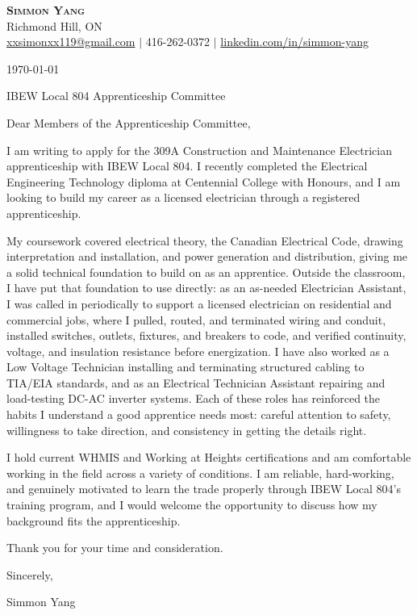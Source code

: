 \documentclass[letterpaper,11pt]{article}
\begin{document}
\begin{center}
    \textbf{\Huge \scshape Simmon Yang} \\ \vspace{1pt}
    Richmond Hill, ON \\
    \href{mailto:xxsimonxx119@gmail.com}{xxsimonxx119@gmail.com} $|$ 416-262-0372 $|$
    \href{https://www.linkedin.com/in/simmon-yang/}{linkedin.com/in/simmon-yang}
\end{center}

\vspace{10pt}

\today

IBEW Local 804 Apprenticeship Committee

Dear Members of the Apprenticeship Committee,

I am writing to apply for the 309A Construction and Maintenance Electrician apprenticeship with IBEW Local 804. I recently completed the Electrical Engineering Technology diploma at Centennial College with Honours, and I am looking to build my career as a licensed electrician through a registered apprenticeship.

My coursework covered electrical theory, the Canadian Electrical Code, drawing interpretation and installation, and power generation and distribution, giving me a solid technical foundation to build on as an apprentice. Outside the classroom, I have put that foundation to use directly: as an as-needed Electrician Assistant, I was called in periodically to support a licensed electrician on residential and commercial jobs, where I pulled, routed, and terminated wiring and conduit, installed switches, outlets, fixtures, and breakers to code, and verified continuity, voltage, and insulation resistance before energization. I have also worked as a Low Voltage Technician installing and terminating structured cabling to TIA/EIA standards, and as an Electrical Technician Assistant repairing and load-testing DC-AC inverter systems. Each of these roles has reinforced the habits I understand a good apprentice needs most: careful attention to safety, willingness to take direction, and consistency in getting the details right.

I hold current WHMIS and Working at Heights certifications and am comfortable working in the field across a variety of conditions. I am reliable, hard-working, and genuinely motivated to learn the trade properly through IBEW Local 804's training program, and I would welcome the opportunity to discuss how my background fits the apprenticeship.

Thank you for your time and consideration.

Sincerely,

Simmon Yang
\end{document}
